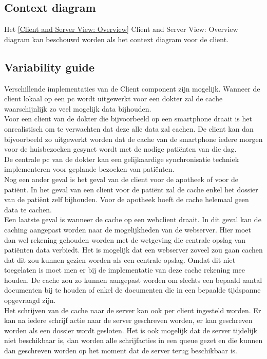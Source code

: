 \documentclass[a4paper,10pt]{article}
\begin{document}
\subsection{Context diagram}
Het \ref{Client and Server View: Overview} Client and Server View: Overview diagram kan beschouwd worden als het context diagram voor de client.

\subsection{Variability guide}
Verschillende implementaties van de Client component zijn mogelijk.  Wanneer de client lokaal op een pc wordt uitgewerkt voor een dokter zal de cache waarschijnlijk zo veel mogelijk data bijhouden.\\
Voor een client van de dokter die bijvoorbeeld op een smartphone draait is het onrealistisch om te verwachten dat deze alle data zal cachen.  De client kan dan bijvoorbeeld zo uitgewerkt worden dat de cache van de smartphone iedere morgen voor de huisbezoeken gesynct wordt met de nodige pati\"{e}nten van die dag.\\
De centrale pc van de dokter kan een gelijkaardige synchronisatie techniek implementeren voor geplande bezoeken van pati\"{e}nten.\\
Nog een ander geval is het geval van de client voor de apotheek of voor de pati\"{e}nt.  In het geval van een client voor de pati\"{e}nt zal de cache enkel het dossier van de pati\"{e}nt zelf bijhouden.  Voor de apotheek hoeft de cache helemaal geen data te cachen.\\
Een laatste geval is wanneer de cache op een webclient draait.  In dit geval kan de caching aangepast worden naar de mogelijkheden van de webserver.  Hier moet dan wel rekening gehouden worden met de wetgeving die centrale opslag van pati\"{e}nten data verbiedt.  Het is mogelijk dat een webserver zoveel zou gaan cachen dat dit zou kunnen gezien worden als een centrale opslag.  Omdat dit niet toegelaten is moet men er bij de implementatie van deze cache rekening mee houden.  De cache zou zo kunnen aangepast worden om slechts een bepaald aantal documenten bij te houden of enkel de documenten die in een bepaalde tijdspanne opgevraagd zijn.\\
Het schrijven van de cache naar de server kan ook per client ingesteld worden.  Er kan na iedere schrijf actie naar de server geschreven worden, er kan geschreven worden als een dossier wordt gesloten.  Het is ook mogelijk dat de server tijdelijk niet beschikbaar is, dan worden alle schrijfacties in een queue gezet en die kunnen dan geschreven worden op het moment dat de server terug beschikbaar is.
\end{document}
